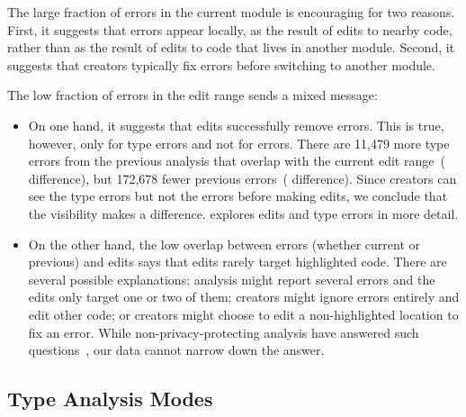 \documentclass[english,submission,cleveref]{programming}
\begin{document}
The large fraction of errors in the current module is encouraging
for two reasons.
First, it suggests that errors appear locally, as the result of edits to nearby
code, rather than as the result of edits to code that lives in another
module.
Second, it suggests that creators typically fix errors before switching
to another module.

The low fraction of errors in the edit range sends a mixed message:
\begin{itemize}
  \item
    On one hand, it suggests that edits successfully remove errors.
    This is true, however, only for type errors and not for \FS{} errors.
    There are 11,479 more type errors from the previous analysis
    that overlap with the current edit range~( difference),
    but 172,678 fewer previous \FS{} errors~( difference).
    Since creators can see the type errors but not the \FS{}
    errors before making edits, we conclude that the visibility
    makes a difference.
     explores edits and type errors in more detail.

  \item
    On the other hand, the low overlap between errors (whether current or previous)
    and edits says that edits rarely target highlighted code.
    There are several possible explanations:
    analysis might report several errors and the edits only target one or two of them;
    creators might ignore errors entirely and edit other code; or
    creators might choose to edit a non-highlighted location to fix an error.
    While non-privacy-protecting analysis have answered such
    questions~\cite{mfk-sigcse-2011}, our data cannot narrow down the answer.

\end{itemize}


\subsection{Type Analysis Modes}
\label{s:type-analysis-modes}
\end{document}
